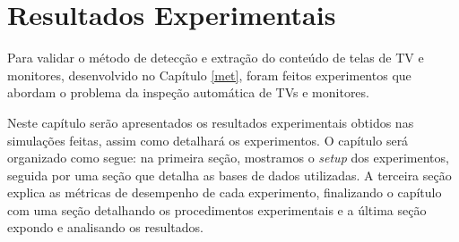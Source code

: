 \chapter{Resultados Experimentais} \label{exp}


Para validar o método de detecção e extração do conteúdo de telas de TV e monitores, desenvolvido no Capítulo \ref{met}, foram feitos experimentos que abordam o problema da inspeção automática de TVs e monitores. 




Neste capítulo serão apresentados os resultados experimentais obtidos nas simulações feitas, assim como detalhará os experimentos. O capítulo será organizado como segue: na primeira seção, mostramos o \textit{setup} dos experimentos, seguida por uma seção que detalha as bases de dados utilizadas. A terceira seção explica as métricas de desempenho de cada experimento, finalizando o capítulo com uma seção detalhando os procedimentos experimentais e a última seção expondo e analisando os resultados.


